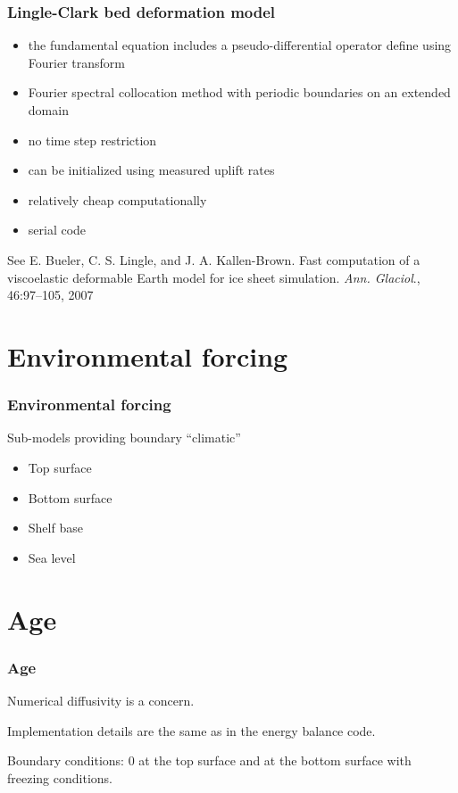 \documentclass[hide notes,intlimits]{beamer}
\begin{document}
\begin{frame}
  \frametitle{Lingle-Clark bed deformation model}

  \begin{itemize}
  \item the fundamental equation includes a pseudo-differential
    operator define using Fourier transform
  \item Fourier spectral collocation method with periodic boundaries
    on an extended domain
  \item no time step restriction
  \item can be initialized using measured uplift rates
  \item relatively cheap computationally
  \item serial code
  \end{itemize}

  See E. Bueler, C. S. Lingle, and J. A. Kallen-Brown. Fast
  computation of a viscoelastic deformable Earth model for ice sheet
  simulation. \emph{Ann. Glaciol}., 46:97–105, 2007
\end{frame}

\section{Environmental forcing}
\label{sec:environment}

\begin{frame}
  \frametitle{Environmental forcing}

  Sub-models providing boundary ``climatic''

  \begin{itemize}
  \item Top surface
  \item Bottom surface
  \item Shelf base
  \item Sea level
  \end{itemize}
\end{frame}


\section{Age}
\label{sec:age}

\begin{frame}
  \frametitle{Age}

  Numerical diffusivity is a concern.

  Implementation details are the same as in the energy balance code.

  Boundary conditions: 0 at the top surface and at the bottom surface
  with freezing conditions.
\end{frame}
\end{document}

